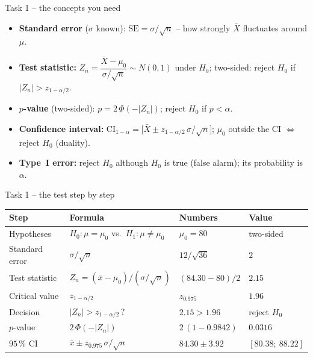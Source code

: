 \documentclass[aspectratio=169,11pt]{beamer}
\begin{document}
\begin{frame}{Task 1 -- the concepts you need}
  \begin{itemize}\setlength{\itemsep}{3pt}
    \item \textbf{Standard error} ($\sigma$ known): $\mathrm{SE} = \sigma/\sqrt{n}$ -- how strongly $\bar X$ fluctuates around $\mu$.
    \item \textbf{Test statistic:} $Z_n = \dfrac{\bar X-\mu_0}{\sigma/\sqrt{n}} \sim N(0,1)$ under $H_0$; two-sided: reject $H_0$ if $|Z_n| > z_{1-\alpha/2}$.
    \item \textbf{$p$-value} (two-sided): $p = 2\,\Phi(-|Z_n|)$; reject $H_0$ if $p < \alpha$.
    \item \textbf{Confidence interval:} $\text{CI}_{1-\alpha} = \bigl[\bar X \pm z_{1-\alpha/2}\,\sigma/\sqrt{n}\bigr]$; $\mu_0$ outside the CI $\Leftrightarrow$ reject $H_0$ (duality).
    \item \textbf{Type~I error:} reject $H_0$ although $H_0$ is true (false alarm); its probability is $\alpha$.
  \end{itemize}
\end{frame}

\begin{frame}{Task 1 -- the test step by step}
  \begin{center}\small
  \renewcommand{\arraystretch}{1.3}
  \begin{tabular}{@{}llll@{}}
    \toprule
    Step & Formula & Numbers & Value\\
    \midrule
    Hypotheses & $H_0\colon\mu = \mu_0$ vs.\ $H_1\colon\mu \neq \mu_0$ & $\mu_0 = 80$ & two-sided\\
    Standard error & $\sigma/\sqrt{n}$ & $12/\sqrt{36}$ & $2$\\
    Test statistic & $Z_n = (\bar x-\mu_0)/(\sigma/\sqrt{n})$ & $(84.30-80)/2$ & $2.15$\\
    Critical value & $z_{1-\alpha/2}$ & $z_{0.975}$ & $1.96$\\
    Decision & $|Z_n| > z_{1-\alpha/2}$\,? & $2.15 > 1.96$ & reject $H_0$\\
    $p$-value & $2\,\Phi(-|Z_n|)$ & $2\,(1-0.9842)$ & $0.0316$\\
    $95\,\%$ CI & $\bar x \pm z_{0.975}\,\sigma/\sqrt{n}$ & $84.30 \pm 3.92$ & $[80.38;\ 88.22]$\\
    \bottomrule
  \end{tabular}
  \end{center}
\end{frame}
\end{document}
